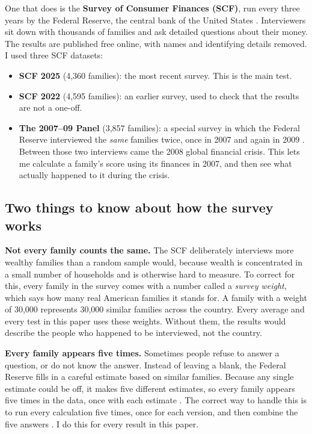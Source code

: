 \documentclass[11pt,a4paper]{article}
\begin{document}
One that does is the \textbf{Survey of Consumer Finances (SCF)}, run every three years by the Federal Reserve, the
central bank of the United States \cite{scf2025,scf2022}. Interviewers sit down with thousands of families and ask
detailed questions about their money. The results are published free online, with names and identifying details
removed. I used three SCF datasets:
\begin{itemize}
\item \textbf{SCF 2025} (4,360 families): the most recent survey. This is the main test.
\item \textbf{SCF 2022} (4,595 families): an earlier survey, used to check that the results are not a one-off.
\item \textbf{The 2007--09 Panel} (3,857 families): a special survey in which the Federal Reserve interviewed the
\emph{same} families twice, once in 2007 and again in 2009 \cite{bricker2011}. Between those two interviews came the
2008 global financial crisis. This lets me calculate a family's score using its finances in 2007, and then see what
actually happened to it during the crisis.
\end{itemize}

\subsection{Two things to know about how the survey works}
\textbf{Not every family counts the same.} The SCF deliberately interviews more wealthy families than a random sample
would, because wealth is concentrated in a small number of households and is otherwise hard to measure. To correct for
this, every family in the survey comes with a number called a \emph{survey weight}, which says how many real American
families it stands for. A family with a weight of 30,000 represents 30,000 similar families across the country. Every
average and every test in this paper uses these weights. Without them, the results would describe the people who
happened to be interviewed, not the country.

\textbf{Every family appears five times.} Sometimes people refuse to answer a question, or do not know the answer.
Instead of leaving a blank, the Federal Reserve fills in a careful estimate based on similar families. Because any
single estimate could be off, it makes five different estimates, so every family appears five times in the data, once
with each estimate \cite{kennickell1998}. The correct way to handle this is to run every calculation five times, once
for each version, and then combine the five answers \cite{rubin1987}. I do this for every result in this paper.
\end{document}
